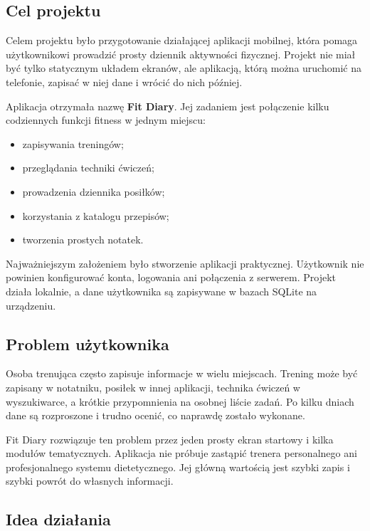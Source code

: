 \documentclass[12pt,a4paper]{article}
\begin{document}
\subsection{Cel projektu}

Celem projektu było przygotowanie działającej aplikacji mobilnej, która pomaga użytkownikowi prowadzić prosty dziennik aktywności fizycznej. Projekt nie miał być tylko statycznym układem ekranów, ale aplikacją, którą można uruchomić na telefonie, zapisać w niej dane i wrócić do nich później.

Aplikacja otrzymała nazwę \textbf{Fit Diary}. Jej zadaniem jest połączenie kilku codziennych funkcji fitness w jednym miejscu:

\begin{itemize}
    \item zapisywania treningów;
    \item przeglądania techniki ćwiczeń;
    \item prowadzenia dziennika posiłków;
    \item korzystania z katalogu przepisów;
    \item tworzenia prostych notatek.
\end{itemize}

Najważniejszym założeniem było stworzenie aplikacji praktycznej. Użytkownik nie powinien konfigurować konta, logowania ani połączenia z serwerem. Projekt działa lokalnie, a dane użytkownika są zapisywane w bazach SQLite na urządzeniu.

\subsection{Problem użytkownika}

Osoba trenująca często zapisuje informacje w wielu miejscach. Trening może być zapisany w notatniku, posiłek w innej aplikacji, technika ćwiczeń w wyszukiwarce, a krótkie przypomnienia na osobnej liście zadań. Po kilku dniach dane są rozproszone i trudno ocenić, co naprawdę zostało wykonane.

Fit Diary rozwiązuje ten problem przez jeden prosty ekran startowy i kilka modułów tematycznych. Aplikacja nie próbuje zastąpić trenera personalnego ani profesjonalnego systemu dietetycznego. Jej główną wartością jest szybki zapis i szybki powrót do własnych informacji.

\subsection{Idea działania}
\end{document}
